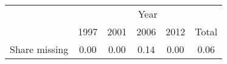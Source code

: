 \begin{tabular}{lccccc}
 \toprule
            &   \multicolumn{5}{c}{Year}       \\
            &        1997&        2001&        2006&        2012&       Total\\
\midrule
Share missing &         0.00&        0.00&        0.14&        0.00&        0.06\\
\bottomrule
\end{tabular}
